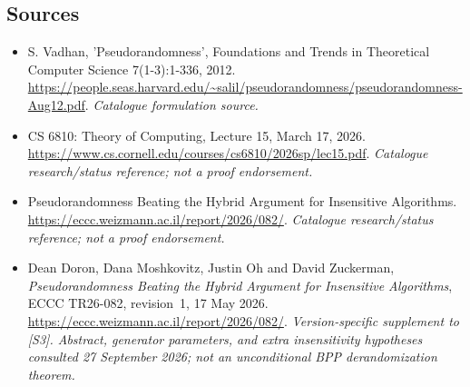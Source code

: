 \documentclass[11pt,a4paper]{article}
\numberwithin{equation}{section}
\begin{document}
\subsection{Sources}
\begin{itemize}\raggedright
\item[\textnormal{[S1]}]\hypertarget{source:statement:1}{} S. Vadhan, 'Pseudorandomness', Foundations and Trends in Theoretical Computer Science 7(1-3):1-336, 2012.
\url{https://people.seas.harvard.edu/~salil/pseudorandomness/pseudorandomness-Aug12.pdf}.
{\small\textit{Catalogue formulation source.}}
\item[\textnormal{[S2]}]\hypertarget{source:statement:2}{} CS 6810: Theory of Computing, Lecture 15, March 17, 2026.
\url{https://www.cs.cornell.edu/courses/cs6810/2026sp/lec15.pdf}.
{\small\textit{Catalogue research/status reference; not a proof endorsement.}}
\item[\textnormal{[S3]}]\hypertarget{source:statement:3}{} Pseudorandomness Beating the Hybrid Argument for Insensitive Algorithms.
\url{https://eccc.weizmann.ac.il/report/2026/082/}.
{\small\textit{Catalogue research/status reference; not a proof endorsement.}}
\item[\textnormal{[E1]}]\hypertarget{extra:statement:1}{} Dean Doron, Dana Moshkovitz,
Justin Oh and David Zuckerman, \emph{Pseudorandomness Beating the Hybrid
Argument for Insensitive Algorithms}, ECCC TR26-082, revision~1,
17 May 2026.
\url{https://eccc.weizmann.ac.il/report/2026/082/}.
{\small\textit{Version-specific supplement to [S3]. Abstract, generator
parameters, and extra insensitivity hypotheses consulted 27 September 2026;
not an unconditional BPP derandomization theorem.}}

\end{itemize}

\end{document}

